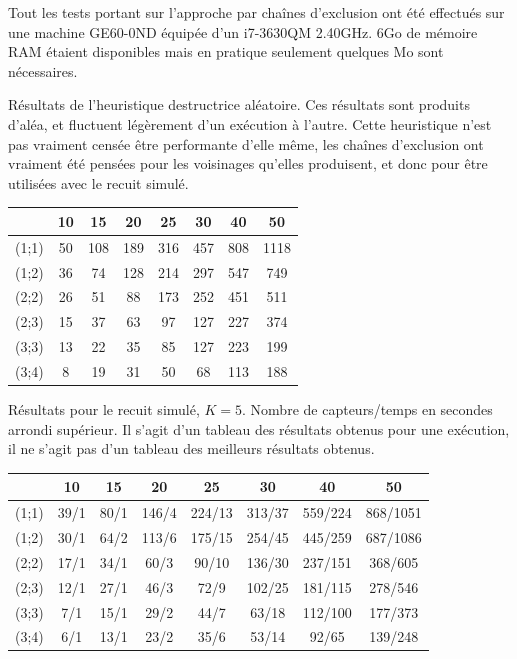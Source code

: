 \documentclass[12pt,a4paper]{article}
\begin{document}
Tout les tests portant sur l'approche par chaînes d'exclusion ont été effectués sur une machine GE60-0ND équipée d'un i7-3630QM 2.40GHz. 6Go de mémoire RAM étaient disponibles mais en pratique seulement quelques Mo sont nécessaires.

Résultats de l'heuristique destructrice aléatoire. Ces résultats sont produits d'aléa, et fluctuent légèrement d'un exécution à l'autre. Cette heuristique n'est pas vraiment censée être performante d'elle même, les chaînes d'exclusion ont vraiment été pensées pour les voisinages qu'elles produisent, et donc pour être utilisées avec le recuit simulé. 
\begin{center}
\begin{tabular}{|c|c|c|c|c|c|c|c|}
\hline
&10 & 15 & 20 & 25 & 30 & 40 & 50\\
\hline 
(1;1) & 50 & 108 & 189 & 316 & 457 & 808 & 1118 \\ 
\hline 
(1;2) & 36 & 74 & 128 & 214 & 297 & 547 & 749 \\ 
\hline 
(2;2) & 26 & 51 & 88 & 173 & 252 & 451 & 511 \\ 
\hline 
(2;3) & 15 & 37 & 63 & 97 & 127 & 227 & 374 \\ 
\hline 
(3;3) & 13 & 22 & 35 & 85 & 127 & 223 & 199 \\ 
\hline 
(3;4) & 8 & 19 & 31 & 50 & 68 & 113 & 188 \\ 
\hline 
\end{tabular} 
\end{center}

Résultats pour le recuit simulé, $K=5$. 
Nombre de capteurs/temps en secondes arrondi supérieur. Il s'agit d'un tableau des résultats obtenus pour une exécution, il ne s'agit pas d'un tableau des meilleurs résultats obtenus.

\begin{center}
\begin{tabular}{|c|c|c|c|c|c|c|c|}
\hline
&10 & 15 & 20 & 25 & 30 & 40 & 50\\
\hline 
(1;1) & 39/1 & 80/1 & 146/4 & 224/13 & 313/37 & 559/224 & 868/1051 \\ 
\hline 
(1;2) & 30/1 & 64/2 & 113/6 & 175/15 & 254/45 & 445/259 & 687/1086 \\ 
\hline 
(2;2) & 17/1 & 34/1 & 60/3 & 90/10 & 136/30 & 237/151 & 368/605 \\ 
\hline 
(2;3) & 12/1 & 27/1 & 46/3& 72/9 & 102/25 & 181/115 & 278/546 \\ 
\hline 
(3;3) & 7/1 & 15/1 & 29/2 & 44/7 & 63/18 & 112/100 & 177/373 \\ 
\hline 
(3;4) & 6/1 & 13/1 & 23/2 & 35/6 & 53/14 & 92/65 & 139/248 \\ 
\hline 
\end{tabular} 
\end{center}
\end{document}
